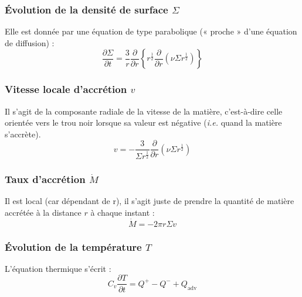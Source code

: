 \subsubsection{\texorpdfstring{Évolution de la densité de surface $\Sigma$}{Évolution de la densité de surface Σ}}

Elle est donnée par une équation de type parabolique (« proche » d’une équation
de diffusion) :
\begin{equation}
    \label{eq:densite_surface}
    \frac{\partial \Sigma}{\partial t} = \frac{3}{r} \frac{\partial}{\partial r} \left\{ r^\frac{1}{2} \frac{\partial}{\partial r} \left(\nu \Sigma r^\frac{1}{2} \right) \right\}
\end{equation}

\subsubsection{\texorpdfstring{Vitesse locale d’accrétion $v$}{Vitesse locale d’accrétion v}}

Il s’agit de la composante radiale de la vitesse de la matière, c’est-à-dire
celle orientée vers le trou noir lorsque sa valeur est négative (\textit{i.e.}
quand la matière s’accrète).
\begin{equation}
    \label{eq:vitesse_accretion}
    v = - \frac{3}{\Sigma r^\frac{1}{2}} \frac{\partial}{\partial r} \left( \nu \Sigma r^\frac{1}{2} \right)
\end{equation}

\subsubsection{\texorpdfstring{Taux d’accrétion $\dot{M}$}{Taux d’accrétion dM/dt}}

Il est local (car dépendant de r), il s’agit juste de prendre la quantité de
matière accrétée à la distance $r$ à chaque instant :
\begin{equation}
    \label{eq:taux_accretion}
    \dot{M} = - 2 \pi r \Sigma v
\end{equation}

\subsubsection{\texorpdfstring{Évolution de la température $T$}{Évolution de la température \textit{T}}}

L’équation thermique s’écrit :
\begin{equation}
    \label{eq:equation_thermique_th}
    C_v \frac{\partial T}{\partial t} = Q^+ - Q^- + Q_\mathrm{adv}
\end{equation}

